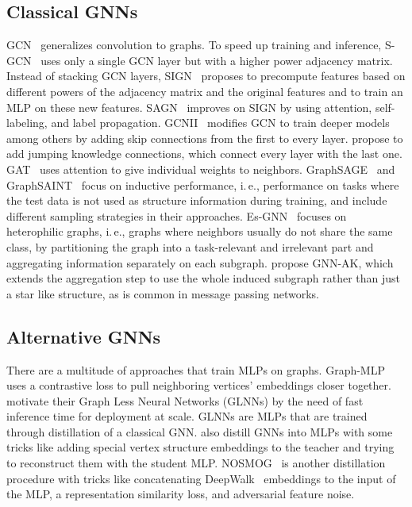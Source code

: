 \documentclass[conference]{IEEEtran}
\newcommand{\ie}{i.\,e.,\xspace}
\begin{document}
\subsection{Classical GNNs}

GCN~\citep{DBLP:conf/iclr/KipfW17} generalizes convolution to graphs.
To speed up training and inference, S-GCN~\citep{DBLP:conf/icml/WuSZFYW19} uses only a single GCN layer but with a higher power adjacency matrix.
Instead of stacking GCN layers, SIGN~\citep{SIGN/corr/abs-2004-11198} proposes to precompute features based on different powers of the adjacency matrix and the original features and to train an MLP on these new features.
SAGN~\citep{SAGN/corr/abs-2104-09376} improves on SIGN by using attention, self-labeling, and label propagation.
GCNII~\citep{DBLP:conf/icml/ChenWHDL20} modifies GCN to train deeper models among others by adding skip connections from the first to every layer.
\citet{DBLP:conf/icml/XuLTSKJ18} propose to add jumping knowledge connections, which connect every layer with the last one.
GAT~\citep{DBLP:conf/iclr/VelickovicCCRLB18} uses attention to give individual weights to neighbors.
GraphSAGE~\citep{DBLP:conf/nips/HamiltonYL17} and GraphSAINT~\citep{DBLP:conf/iclr/ZengZSKP20} focus on inductive performance, \ie performance on tasks where the test data is not used as structure information during training, and include different sampling strategies in their approaches.
Es-GNN~\citep{esgnn/corr/abs-2205-13700} focuses on heterophilic graphs, \ie graphs where neighbors usually do not share the same class, by partitioning the graph into a task-relevant and irrelevant part and aggregating information separately on each subgraph.
\citet{DBLP:conf/iclr/ZhaoJAS22} propose GNN-AK, which extends the aggregation step to use the whole induced subgraph rather than just a star like structure, as is common in message passing networks.


\subsection{Alternative GNNs}

There are a multitude of approaches that train MLPs on graphs.
Graph-MLP~\citep{graphMLP} uses a contrastive loss to pull neighboring vertices' embeddings closer together.
\citet{DBLP:conf/iclr/ZhangLSS22} motivate their Graph Less Neural Networks (GLNNs) by the need of fast inference time for deployment at scale.
GLNNs are MLPs that are trained through distillation of a classical GNN.
\citet{DBLP:conf/iclr/ZhengH0KWS22} also distill GNNs into MLPs with some tricks like adding special vertex structure embeddings to the teacher and trying to reconstruct them with the student MLP.
NOSMOG~\citep{DBLP:conf/iclr/0001ZG0C23} is another distillation procedure with tricks like concatenating DeepWalk~\citep{DBLP:conf/kdd/PerozziAS14} embeddings to the input of the MLP, a representation similarity loss, and adversarial feature noise.
\end{document}
